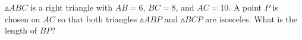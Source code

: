 $\vartriangle ABC$ is a right triangle with $AB = 6$, $BC = 8$, and $AC = 10$. A point $P$ is chosen on $AC$ so that both triangles  $\vartriangle ABP$ and  $\vartriangle BCP$ are isosceles. What is the length of $BP$?
